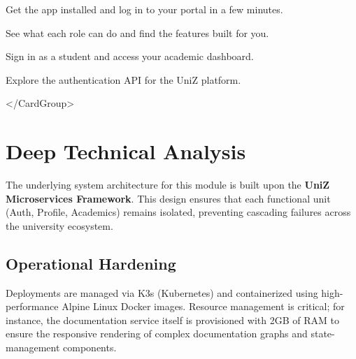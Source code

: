 \begin{tcolorbox}[colback=gray!5,colframe=primary,title=Documentation Note]

  
\begin{tcolorbox}[colback=gray!5,colframe=primary,title=Documentation Note]

    Get the app installed and log in to your portal in a few minutes.
  
\end{tcolorbox}

  
\begin{tcolorbox}[colback=gray!5,colframe=primary,title=Documentation Note]

    See what each role can do and find the features built for you.
  
\end{tcolorbox}

  
\begin{tcolorbox}[colback=gray!5,colframe=primary,title=Documentation Note]

    Sign in as a student and access your academic dashboard.
  
\end{tcolorbox}

  
\begin{tcolorbox}[colback=gray!5,colframe=primary,title=Documentation Note]

    Explore the authentication API for the UniZ platform.
  
\end{tcolorbox}

</CardGroup>


\section{Deep Technical Analysis}
The underlying system architecture for this module is built upon the \textbf{UniZ Microservices Framework}. 
This design ensures that each functional unit (Auth, Profile, Academics) remains isolated, preventing cascading failures across the university ecosystem.

\subsection{Operational Hardening}
Deployments are managed via K3s (Kubernetes) and containerized using high-performance Alpine Linux Docker images. 
Resource management is critical; for instance, the documentation service itself is provisioned with 2GB of RAM to ensure the responsive rendering of complex documentation graphs and state-management components.


\end{tcolorbox}
